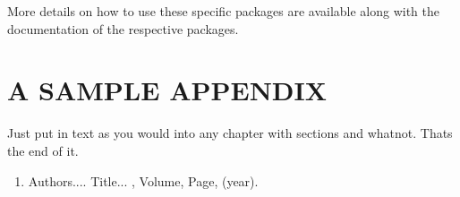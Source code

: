 \documentclass[BTech]{iitmdiss}
\begin{document}
More details on how to use these specific packages are available along
with the documentation of the respective packages.


\appendix

\chapter{A SAMPLE APPENDIX}

Just put in text as you would into any chapter with sections and
whatnot.  Thats the end of it.


\begin{singlespace}
  
\end{singlespace}



\listofpapers

\begin{enumerate}  
\item Authors....  \newblock
 Title...
  , Volume,
  Page, (year).
\end{enumerate}  
\end{document}
